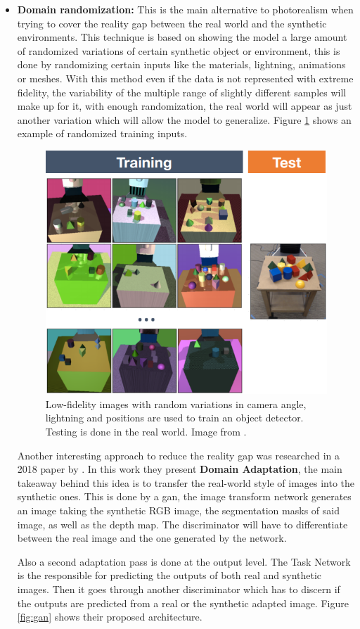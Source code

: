 \begin{itemize}
	\item \textbf{Domain randomization:} This is the main alternative to photorealism when trying to cover the reality gap between the real world and the synthetic environments. This technique is based on showing the model a large amount of randomized variations of certain synthetic object or environment, this is done by randomizing certain inputs like the materials, lightning, animations or meshes. With this method even if the data is not represented with extreme fidelity, the variability of the multiple range of slightly different samples will make up for it, with enough randomization, the real world will appear as just another variation which will allow the model to generalize. Figure \ref{fig:domainrandomization} shows an example of randomized training inputs.
	
	\begin{figure}
		\centering
		\includegraphics[width=0.5\linewidth]{archivos/domain_randomization}
		\caption{Low-fidelity images with random variations in camera angle, lightning and positions are used to train an object detector. Testing is done in the real world. Image from \cite{DBLP:journals/corr/TobinFRSZA17}.}
		\label{fig:domainrandomization}
	\end{figure}

	Another interesting approach to reduce the reality gap was researched in a 2018 paper by \cite{DBLP:journals/corr/abs-1812-05040}. In this work they present \textbf{Domain Adaptation}, the main takeaway behind this idea is to transfer the real-world style of images into the synthetic ones. This is done by a \gls{gan}, the image transform network generates an image taking the synthetic RGB image, the segmentation masks of said image, as well as the depth map. The discriminator will have to differentiate between the real image and the one generated by the network. 
	
	Also a second adaptation pass is done at the output level. The Task Network is the responsible for predicting the outputs of both real and synthetic images. Then it goes through another discriminator which has to discern if the outputs are predicted from a real or the synthetic adapted image. Figure \ref{fig:gan} shows their proposed architecture.
	

\end{itemize}
